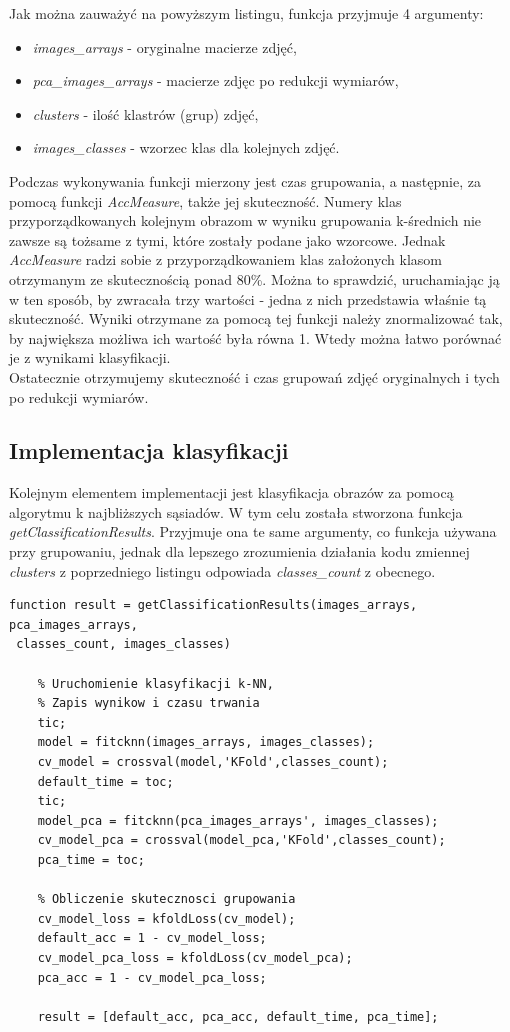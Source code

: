 Jak można zauważyć na powyższym listingu, funkcja przyjmuje 4 argumenty:
\begin{itemize}
	\item \textit{images\_arrays} - oryginalne macierze zdjęć,
	\item \textit{pca\_images\_arrays} - macierze zdjęc po redukcji wymiarów,
	\item \textit{clusters} - ilość klastrów (grup) zdjęć,
	\item \textit{images\_classes} - wzorzec klas dla kolejnych zdjęć.
\end{itemize}
Podczas wykonywania funkcji mierzony jest czas grupowania, a następnie, za pomocą funkcji \textit{AccMeasure}, także jej skuteczność. Numery klas przyporządkowanych kolejnym obrazom w wyniku grupowania k-średnich nie zawsze są tożsame z tymi, które zostały podane jako wzorcowe. Jednak \textit{AccMeasure} radzi sobie z przyporządkowaniem klas założonych klasom otrzymanym ze skutecznością ponad 80\%. Można to sprawdzić, uruchamiając ją w ten sposób, by zwracała trzy wartości - jedna z nich przedstawia właśnie tą skuteczność. Wyniki otrzymane za pomocą tej funkcji należy znormalizować tak, by największa możliwa ich wartość była równa 1. Wtedy można łatwo porównać je z wynikami klasyfikacji.\\
Ostatecznie otrzymujemy skuteczność i czas grupowań zdjęć oryginalnych i tych po redukcji wymiarów.

\subsection{Implementacja klasyfikacji}

Kolejnym elementem implementacji jest klasyfikacja obrazów za pomocą algorytmu k najbliższych sąsiadów. W tym celu została stworzona funkcja \textit{getClassificationResults}. Przyjmuje ona te same argumenty, co funkcja używana przy grupowaniu, jednak dla lepszego zrozumienia działania kodu zmiennej \textit{clusters} z poprzedniego listingu odpowiada \textit{classes\_count} z obecnego.

\vspace{5mm} 

\begin{lstlisting}[linewidth=16.0cm]
function result = getClassificationResults(images_arrays, pca_images_arrays,
 classes_count, images_classes)

	% Uruchomienie klasyfikacji k-NN,
	% Zapis wynikow i czasu trwania
	tic;
	model = fitcknn(images_arrays, images_classes);
	cv_model = crossval(model,'KFold',classes_count);
	default_time = toc;
	tic;
	model_pca = fitcknn(pca_images_arrays', images_classes);
	cv_model_pca = crossval(model_pca,'KFold',classes_count);
	pca_time = toc;
	
	% Obliczenie skutecznosci grupowania
	cv_model_loss = kfoldLoss(cv_model);
	default_acc = 1 - cv_model_loss;
	cv_model_pca_loss = kfoldLoss(cv_model_pca);
	pca_acc = 1 - cv_model_pca_loss;
	
	result = [default_acc, pca_acc, default_time, pca_time];
\end{lstlisting}

